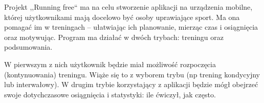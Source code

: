 

Projekt ,,Running free`` ma na celu stworzenie aplikacji na urządzenia mobilne, której użytkownikami mają docelowo być osoby uprawiające sport. Ma ona pomagać im w treningach -- ułatwiając ich planowanie, mierząc czas i osiągnięcia oraz motywując. 
Program ma działać w dwóch trybach: treningu oraz podsumowania.

W pierwszym z nich użytkownik będzie miał możliwość rozpoczęcia (kontynuowania) treningu. Wiąże się to z wyborem trybu (np trening kondycyjny lub interwałowy).
W drugim trybie korzystający z aplikacji będzie mógł obejrzeć swoje dotychczasowe osiągnięcia i statystyki: ile ćwiczył, jak często. 

